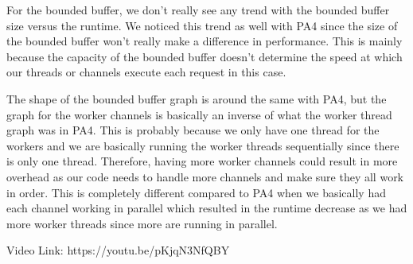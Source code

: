 \documentclass[12pt]{article}
\begin{document}
For the bounded buffer, we don't really see any trend with the bounded buffer size versus the runtime. We noticed this trend as well with PA4 since the size of the bounded buffer won't really make a difference in performance. This is mainly because the capacity of the bounded buffer doesn't determine the speed at which our threads or channels execute each request in this case. 

The shape of the bounded buffer graph is around the same with PA4, but the graph for the worker channels is basically an inverse of what the worker thread graph was in PA4. This is probably because we only have one thread for the workers and we are basically running the worker threads sequentially since there is only one thread. Therefore, having more worker channels could result in more overhead as our code needs to handle more channels and make sure they all work in order. This is completely different compared to PA4 when we basically had each channel working in parallel which resulted in the runtime decrease as we had more worker threads since more are running in parallel. 

Video Link: https://youtu.be/pKjqN3NfQBY
\end{document}
